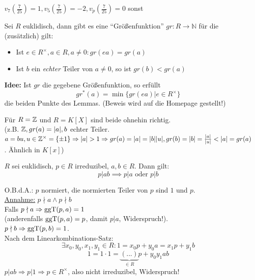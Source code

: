 \documentclass[a4paper,twoside,DIV15,BCOR12mm]{scrbook}
\begin{document}
\begin{beispiel}
$v_7(\frac{7}{25}) = 1, v_5(\frac{7}{25}) = -2, v_p(\frac{7}{25}) =
0$ sonst
\end{beispiel}

\begin{lemma}
\label{lemma1} Sei $R$ euklidisch, dann gibt es eine
"`Größenfunktion"' $gr: R \to \mathbb{N}$ für die (zusätzlich) gilt:
\begin{itemize}
\item Ist $e \in R^\times, a \in R, a\not= 0: gr(ea) = gr(a)$
\item Ist $b$ ein \emph{echter} Teiler von $a \not= 0$, so ist $gr(b) < gr(a)$
\end{itemize}
\end{lemma}

\begin{beweis}
\textbf{Idee:} Ist $gr$ die gegebene Größenfunktion, so erfüllt
$$gr^*(a) = \min\{gr(ea) | e \in R^\times\}$$
die beiden Punkte des Lemmas. (Beweis wird auf die Homepage
gestellt!)
\end{beweis}

Für $R = \mathbb{Z}$ und $R = K[X]$ sind beide ohnehin richtig.\\
(z.B. $\mathbb{Z}, gr(a) = |a|, b$ echter Teiler. $a = bu, u \in
\mathbb{Z}^\times = \{\pm 1 \} \Rightarrow |a| > 1 \Rightarrow gr(a) = |a| =
|b||u|, gr(b) = |b| = \frac{|a|}{|u|} < |a| = gr(a)$. Ähnlich in
$K[x]$)

\begin{lemma}
\label{lemma2} $R$ sei euklidisch, $p \in R$ irreduzibel, $a,b \in
R$. Dann gilt:
\[p | ab \implies p | a \text{ oder } p|b\]
\end{lemma}

\begin{beweis}
O.B.d.A.: $p$ normiert, die normierten Teiler von $p$ sind $1$ und $p$.\\
\underline{Annahme:} $p \nmid a \wedge p \nmid b$\\
Falls $p \nmid a \Rightarrow \mathop{\rm ggT}\nolimits(p,a) = 1$ \\
(anderenfalls $\mathop{\rm ggT}\nolimits(p,a) = p$, damit $p | a$, Widerspruch!). \\
$p \nmid b \Rightarrow \mathop{\rm ggT}\nolimits(p,b) = 1$. \\
Nach dem Linearkombinations-Satz: \\
$$\exists x_0, y_0, x_1, y_1 \in R: 1 = x_0p + y_0a = x_1p + y_1b$$
$$1 = 1 \cdot 1 = \underbrace{(...)}_{\in R}p + y_0y_1ab$$
$p | ab \Rightarrow p | 1 \Rightarrow p \in R^\times$, also nicht
irreduzibel, Widerspruch!
\end{beweis}
\end{document}

